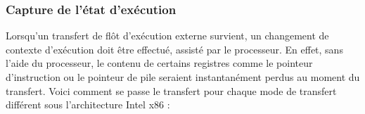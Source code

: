 			\subsubsection{Capture de l'état d'exécution}



Lorsqu'un transfert de flôt d'exécution externe survient, un changement de contexte d'exécution doit être effectué, assisté par le processeur. En effet, sans l'aide du processeur, le contenu de certains registres comme le pointeur d'instruction ou le pointeur de pile seraient instantanément perdus au moment du transfert. Voici comment se passe le transfert pour chaque mode de transfert différent sous l'architecture Intel x86 : 


